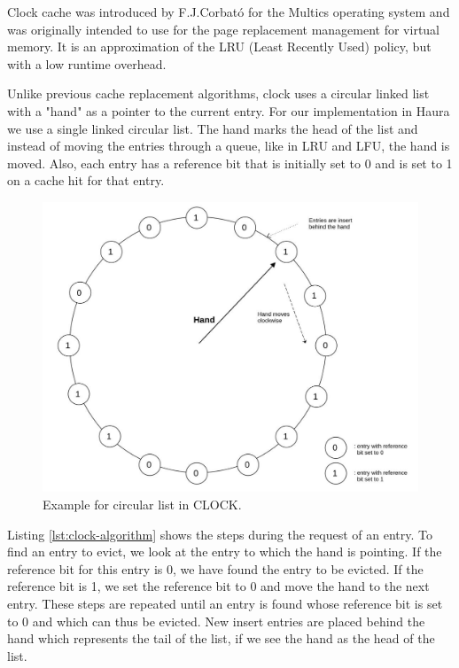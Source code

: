 \documentclass[
	12pt,
	a4paper,
	abstract,
	bibliography=totoc,
	chapterprefix,
	headings=openright,
	numbers=endperiod,
	parskip=half,
	twoside,
]{scrreprt}
\begin{document}
Clock cache was introduced by F.J.Corbató \cite{corbato1968paging} for the Multics operating system and was originally intended 
to use for the page replacement management for virtual memory.
It is an approximation of the LRU (Least Recently Used) policy, but with a low runtime overhead.

Unlike previous cache replacement algorithms, clock uses a circular linked list with a "hand" as a pointer to the current entry.
For our implementation in Haura we use a single linked circular list.
The hand marks the head of the list and instead of moving the entries through a queue, like in LRU and LFU, the hand is moved.
Also, each entry has a reference bit that is initially set to 0 and is set to 1 on a cache hit for that entry.

\begin{figure}[ht]
	\centering
	\includegraphics[scale=0.4]{clock.jpg}
	\caption{Example for circular list in CLOCK.}
		\label{fig:circular list for CLOCK}
\end{figure}


Listing \ref{lst:clock-algorithm} shows the steps during the request of an entry.
To find an entry to evict, we look at the entry to which the hand is pointing.
If the reference bit for this entry is 0, we have found the entry to be evicted.
If the reference bit is 1, we set the reference bit to 0 and move the hand to the next entry.
These steps are repeated until an entry is found whose reference bit is set to 0 and which can thus be evicted.
New insert entries are placed behind the hand which represents the tail of the list, if we see the hand as the head of the list.
\end{document}
